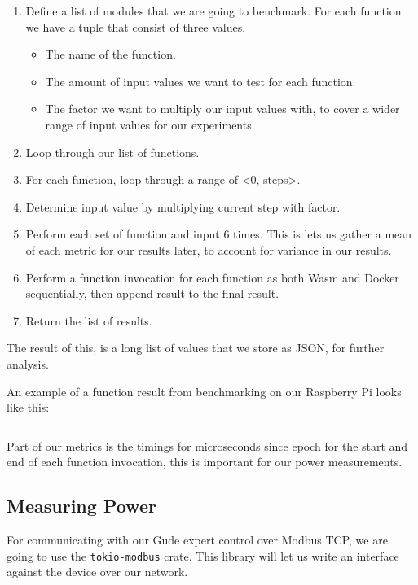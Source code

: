 \documentclass[
  table]{report}
\providecommand{\tightlist}{%
  \setlength{\itemsep}{0pt}\setlength{\parskip}{0pt}}
\begin{document}
\begin{enumerate}
\def\labelenumi{\arabic{enumi}.}
\tightlist
\item
  Define a list of modules that we are going to benchmark. For each
  function we have a tuple that consist of three values.

  \begin{itemize}
  \tightlist
  \item
    The name of the function.
  \item
    The amount of input values we want to test for each function.\\
  \item
    The factor we want to multiply our input values with, to cover a
    wider range of input values for our experiments.
  \end{itemize}
\item
  Loop through our list of functions.
\item
  For each function, loop through a range of \textless0,
  steps\textgreater.
\item
  Determine input value by multiplying current step with factor.
\item
  Perform each set of function and input 6 times. This is lets us gather
  a mean of each metric for our results later, to account for variance
  in our results.
\item
  Perform a function invocation for each function as both Wasm and
  Docker sequentially, then append result to the final result.
\item
  Return the list of results.
\end{enumerate}

The result of this, is a long list of values that we store as JSON, for
further analysis.

An example of a function result from benchmarking on our Raspberry Pi
looks like this:

\inputminted{json}{assets/code/result_example.json}

Part of our metrics is the timings for microseconds since epoch for the
start and end of each function invocation, this is important for our
power measurements.

\subsection{Measuring Power}

For communicating with our Gude expert control over Modbus TCP, we are
going to use the \texttt{tokio-modbus} crate. This library will let us
write an interface against the device over our network.
\end{document}
